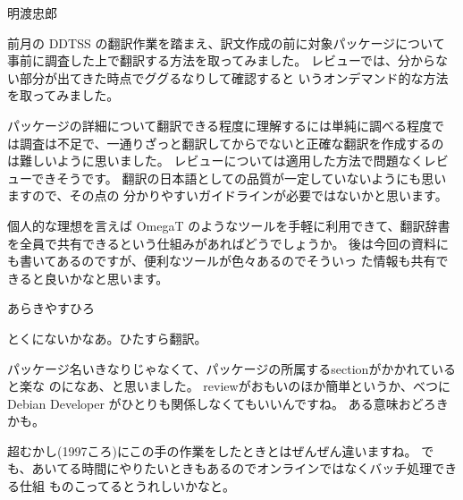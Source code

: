 \begin{prework}{明渡忠郎}


 前月の DDTSS の翻訳作業を踏まえ、訳文作成の前に対象パッケージについて
 事前に調査した上で翻訳する方法を取ってみました。
 レビューでは、分からない部分が出てきた時点でググるなりして確認すると
 いうオンデマンド的な方法を取ってみました。


 パッケージの詳細について翻訳できる程度に理解するには単純に調べる程度で
 は調査は不足で、一通りざっと翻訳してからでないと正確な翻訳を作成するの
 は難しいように思いました。
 レビューについては適用した方法で問題なくレビューできそうです。
 翻訳の日本語としての品質が一定していないようにも思いますので、その点の
 分かりやすいガイドラインが必要ではないかと思います。


 個人的な理想を言えば OmegaT のようなツールを手軽に利用できて、翻訳辞書
 を全員で共有できるという仕組みがあればどうでしょうか。
 後は今回の資料にも書いてあるのですが、便利なツールが色々あるのでそういっ
 た情報も共有できると良いかなと思います。

\end{prework}

\begin{prework}{あらきやすひろ}


とくにないかなあ。ひたすら翻訳。


パッケージ名いきなりじゃなくて、パッケージの所属するsectionがかかれていると楽な
のになあ、と思いました。
reviewがおもいのほか簡単というか、べつに Debian Developer がひとりも関係しなくてもいいんですね。
ある意味おどろきかも。


超むかし(1997ころ)にこの手の作業をしたときとはぜんぜん違いますね。
でも、あいてる時間にやりたいときもあるのでオンラインではなくバッチ処理できる仕組
ものこってるとうれしいかなと。

\end{prework}

